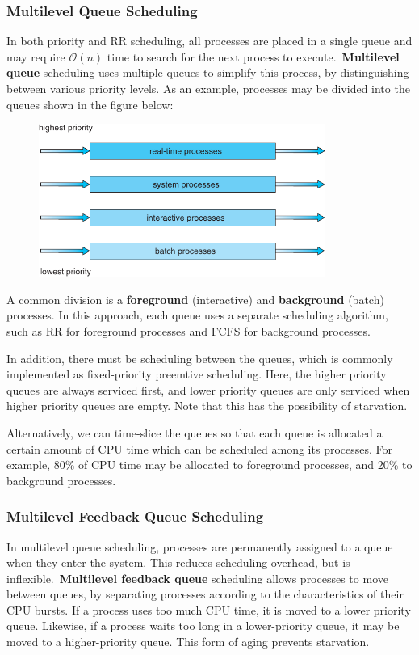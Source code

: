 \documentclass{article}
\begin{document}
\subsubsection{Multilevel Queue Scheduling}
In both priority and RR scheduling, all processes are placed in a
single queue and may require \(\mathcal{O}\left( n \right)\) time to
search for the next process to execute.\ \textbf{Multilevel queue}
scheduling uses multiple queues to simplify this process, by
distinguishing between various priority levels. As an example,
processes may be divided into the queues shown in the figure below:
\begin{figure}[H]
    \centering
    \includegraphics[height = 5cm]{figures/multilevel_queue_scheduling.pdf}
\end{figure}
A common division is a \textbf{foreground} (interactive) and
\textbf{background} (batch) processes.
In this approach, each queue uses a separate scheduling algorithm, such
as RR for foreground processes and FCFS for background processes.

In addition, there must be scheduling between the queues, which is
commonly implemented as fixed-priority preemtive scheduling. Here, the
higher priority queues are always serviced first, and lower priority
queues are only serviced when higher priority queues are empty. Note
that this has the possibility of starvation.

Alternatively, we can time-slice the queues so that each queue is
allocated a certain amount of CPU time which can be scheduled among its
processes. For example, 80\% of CPU time may be allocated to foreground
processes, and 20\% to background processes.
\subsubsection{Multilevel Feedback Queue Scheduling}
In multilevel queue scheduling, processes are permanently assigned to a
queue when they enter the system. This reduces scheduling overhead, but
is inflexible.\ \textbf{Multilevel feedback queue} scheduling allows
processes to move between queues, by separating processes according to
the characteristics of their CPU bursts. If a process uses too much CPU
time, it is moved to a lower priority queue. Likewise, if a process
waits too long in a lower-priority queue, it may be moved to a
higher-priority queue. This form of aging prevents starvation.
\end{document}
